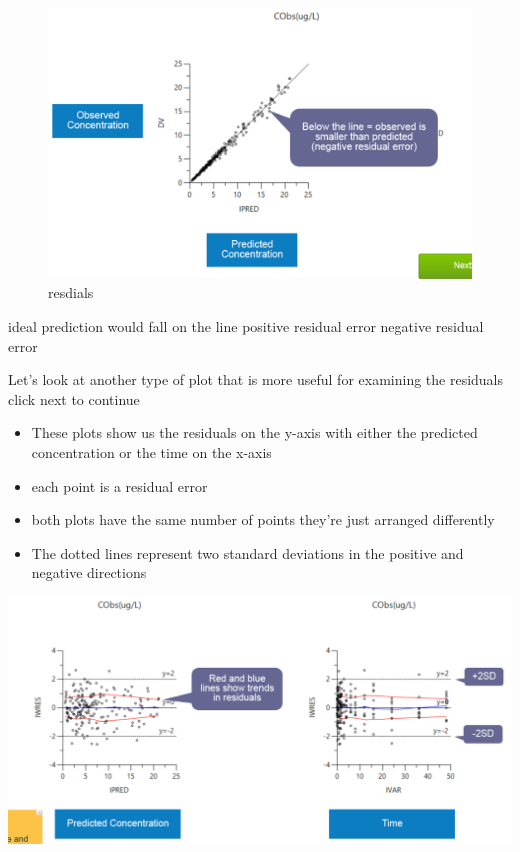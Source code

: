 \documentclass[
  letterpaper,
  DIV=11,
  numbers=noendperiod]{scrreprt}
\providecommand{\tightlist}{%
  \setlength{\itemsep}{0pt}\setlength{\parskip}{0pt}}\usepackage{longtable,booktabs,array}
\begin{document}
\begin{figure}

{\centering \includegraphics{./img/residual-error-1.png}

}

\caption{resdials}

\end{figure}

ideal prediction would fall on the line positive residual error negative
residual error

Let's look at another type of plot that is more useful for examining the
residuals click next to continue

\begin{itemize}
\tightlist
\item
  These plots show us the residuals on the y-axis with either the
  predicted concentration or the time on the x-axis
\item
  each point is a residual error
\item
  both plots have the same number of points they're just arranged
  differently
\item
  The dotted lines represent two standard deviations in the positive and
  negative directions
\end{itemize}

\includegraphics{./img/residual-error-2.png}
\end{document}
